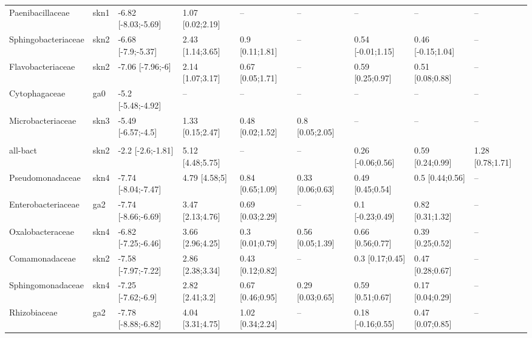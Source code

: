 \begin{table}
{\begin{tabular}[t]{lllllllll}
\hspace{1em}Paenibacillaceae & skn1 & -6.82 [-8.03;-5.69] & 1.07 [0.02;2.19] & -- & -- & -- & -- & --\\
\hspace{1em}Sphingobacteriaceae & skn2 & -6.68 [-7.9;-5.37] & 2.43 [1.14;3.65] & 0.9 [0.11;1.81] & -- & 0.54 [-0.01;1.15] & 0.46 [-0.15;1.04] & --\\
\hspace{1em}Flavobacteriaceae & skn2 & -7.06 [-7.96;-6] & 2.14 [1.07;3.17] & 0.67 [0.05;1.71] & -- & 0.59 [0.25;0.97] & 0.51 [0.08;0.88] & --\\
\hspace{1em}Cytophagaceae & ga0 & -5.2 [-5.48;-4.92] & -- & -- & -- & -- & -- & --\\
\hspace{1em}Microbacteriaceae & skn3 & -5.49 [-6.57;-4.5] & 1.33 [0.15;2.47] & 0.48 [0.02;1.52] & 0.8 [0.05;2.05] & -- & -- & --\\
\addlinespace[0.3em]
\multicolumn{9}{l}{\textbf{site NP}}\\
\hspace{1em}all-bact & skn2 & -2.2 [-2.6;-1.81] & 5.12 [4.48;5.75] & -- & -- & 0.26 [-0.06;0.56] & 0.59 [0.24;0.99] & 1.28 [0.78;1.71]\\
\hspace{1em}Pseudomonadaceae & skn4 & -7.74 [-8.04;-7.47] & 4.79 [4.58;5] & 0.84 [0.65;1.09] & 0.33 [0.06;0.63] & 0.49 [0.45;0.54] & 0.5 [0.44;0.56] & --\\
\hspace{1em}Enterobacteriaceae & ga2 & -7.74 [-8.66;-6.69] & 3.47 [2.13;4.76] & 0.69 [0.03;2.29] & -- & 0.1 [-0.23;0.49] & 0.82 [0.31;1.32] & --\\
\hspace{1em}Oxalobacteraceae & skn4 & -6.82 [-7.25;-6.46] & 3.66 [2.96;4.25] & 0.3 [0.01;0.79] & 0.56 [0.05;1.39] & 0.66 [0.56;0.77] & 0.39 [0.25;0.52] & --\\
\hspace{1em}Comamonadaceae & skn2 & -7.58 [-7.97;-7.22] & 2.86 [2.38;3.34] & 0.43 [0.12;0.82] & -- & 0.3 [0.17;0.45] & 0.47 [0.28;0.67] & --\\
\hspace{1em}Sphingomonadaceae & skn4 & -7.25 [-7.62;-6.9] & 2.82 [2.41;3.2] & 0.67 [0.46;0.95] & 0.29 [0.03;0.65] & 0.59 [0.51;0.67] & 0.17 [0.04;0.29] & --\\
\hspace{1em}Rhizobiaceae & ga2 & -7.78 [-8.88;-6.82] & 4.04 [3.31;4.75] & 1.02 [0.34;2.24] & -- & 0.18 [-0.16;0.55] & 0.47 [0.07;0.85] & --\\

\end{tabular}}
\end{table}

